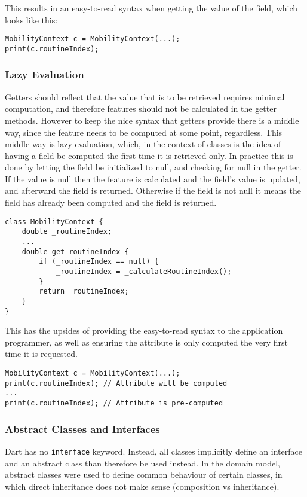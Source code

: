 This results in an easy-to-read syntax when getting the value of the field, which looks like this:

\begin{verbatim}
MobilityContext c = MobilityContext(...);
print(c.routineIndex);
\end{verbatim}

\subsubsection{Lazy Evaluation}
Getters should reflect that the value that is to be retrieved requires minimal computation, and therefore features should not be calculated in the getter methods. However to keep the nice syntax that getters provide there is a middle way, since the feature needs to be computed at some point, regardless. This middle way is lazy evaluation, which, in the context of classes is the idea of having a field be computed the first time it is retrieved only. In practice this is done by letting the field be initialized to null, and checking for null in the getter. If the value is null then the feature is calculated and the field's value is updated, and afterward the field is returned. Otherwise if the field is not null it means the field has already been computed and the field is returned.

\begin{verbatim}
class MobilityContext {
    double _routineIndex;
    ...
    double get routineIndex {
        if (_routineIndex == null) {
            _routineIndex = _calculateRoutineIndex();
        }
        return _routineIndex;
    }
}
\end{verbatim}

This has the upsides of providing the easy-to-read syntax to the application programmer, as well as ensuring the attribute is only computed the very first time it is requested.

\begin{verbatim}
MobilityContext c = MobilityContext(...);
print(c.routineIndex); // Attribute will be computed
...
print(c.routineIndex); // Attribute is pre-computed
\end{verbatim}

\subsubsection{Abstract Classes and Interfaces}
Dart has no \verb|interface| keyword. Instead, all classes implicitly define an interface and an abstract class than therefore be used instead. In the domain model, abstract classes were used to define common behaviour of certain classes, in which direct inheritance does not make sense (composition vs inheritance). 

